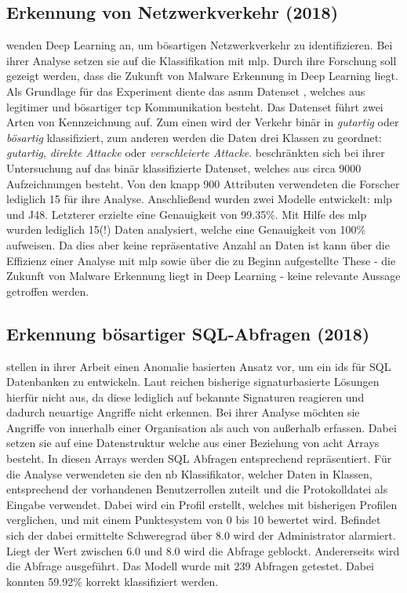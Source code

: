\documentclass[
    12pt, %
    DIV10,
    ngerman, %
    a4paper, %
    oneside, %
    titlepage, %
    parskip=half, %
    headings=normal, %
    listof=totoc, %
    bibliography=totoc, %
    index=totoc, %
    captions=tableheading, %
    final %
]{scrreprt}
\begin{document}
\subsection{Erkennung von Netzwerkverkehr (2018)}\label{asnm}
\textcite{Teoh2018} wenden Deep Learning an, um bösartigen Netzwerkverkehr zu identifizieren. Bei ihrer Analyse setzen sie auf die Klassifikation mit \ac{mlp}. Durch ihre Forschung soll gezeigt werden, dass die Zukunft von Malware Erkennung in Deep Learning liegt. Als Grundlage für das Experiment diente das \ac{asnm} Datenset \parencite{phdthesis}, welches aus legitimer und bösartiger \ac{tcp} Kommunikation besteht. Das Datenset führt zwei Arten von Kennzeichnung auf. Zum einen wird der Verkehr binär in \emph{gutartig} oder \emph{bösartig} klassifiziert, zum anderen werden die Daten drei Klassen zu geordnet: \emph{gutartig}, \emph{direkte Attacke} oder \emph{verschleierte Attacke}. \textcite{Teoh2018} beschränkten sich bei ihrer Untersuchung auf das binär klassifizierte Datenset, welches aus circa 9000 Aufzeichnungen besteht. Von den knapp 900 Attributen verwendeten die Forscher lediglich 15 für ihre Analyse. Anschließend wurden zwei Modelle entwickelt: \ac{mlp} und J48. Letzterer erzielte eine Genauigkeit von 99.35\%. Mit Hilfe des \ac{mlp} wurden lediglich 15(!) Daten analysiert, welche eine Genauigkeit von 100\% aufweisen. Da dies aber keine repräsentative Anzahl an Daten ist kann über die Effizienz einer Analyse mit \ac{mlp} sowie über die zu Beginn aufgestellte These - die Zukunft von Malware Erkennung liegt in Deep Learning - keine relevante Aussage getroffen werden. 
%
\subsection{Erkennung bösartiger SQL-Abfragen (2018)}
\textcite{Jayaprakash2018} stellen in ihrer Arbeit einen Anomalie basierten Ansatz vor, um ein \ac{ids} für SQL Datenbanken zu entwickeln. Laut \textcite{Jayaprakash2018} reichen bisherige signaturbasierte Lösungen hierfür nicht aus, da diese lediglich auf bekannte Signaturen reagieren und dadurch neuartige Angriffe nicht erkennen. Bei ihrer Analyse möchten sie Angriffe von innerhalb einer Organisation als auch von außerhalb erfassen. Dabei setzen sie auf eine Datenstruktur welche aus einer Beziehung von acht Arrays besteht. In diesen Arrays werden SQL Abfragen entsprechend repräsentiert. Für die Analyse verwendeten sie den \acl{nb} Klassifikator, welcher Daten in Klassen, entsprechend der vorhandenen Benutzerrollen zuteilt und die Protokolldatei als Eingabe verwendet. Dabei wird ein Profil erstellt, welches mit bisherigen Profilen verglichen, und mit einem Punktesystem von 0 bis 10 bewertet wird. Befindet sich der dabei ermittelte Schweregrad über 8.0 wird der Administrator alarmiert. Liegt der Wert zwischen 6.0 und 8.0 wird die Abfrage geblockt. Andererseits wird die Abfrage ausgeführt. Das Modell wurde mit 239 Abfragen getestet. Dabei konnten 59.92\% korrekt klassifiziert werden.
%
\end{document}
